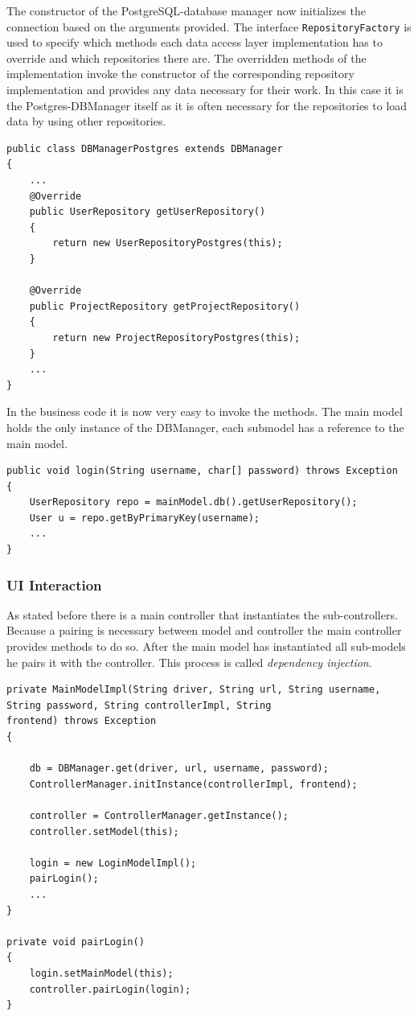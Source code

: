 The constructor of the PostgreSQL-database manager now initializes the connection based on the arguments provided. The interface \texttt{RepositoryFactory} is used to specify which methods each data access layer implementation has to override and which repositories there are. The overridden methods of the implementation invoke the constructor of the corresponding repository implementation and provides any data necessary for their work. In this case it is the Postgres-DBManager itself as it is often necessary for the repositories to load data by using other repositories.

\begin{lstlisting}
public class DBManagerPostgres extends DBManager
{
	...
	@Override
	public UserRepository getUserRepository()
	{
		return new UserRepositoryPostgres(this);
	}
	
	@Override
	public ProjectRepository getProjectRepository()
	{
		return new ProjectRepositoryPostgres(this);
	}
	...
}

\end{lstlisting}

In the business code it is now very easy to invoke the methods. The main model holds the only instance of the DBManager, each submodel has a reference to the main model. 

\begin{lstlisting}
public void login(String username, char[] password) throws Exception
{
	UserRepository repo = mainModel.db().getUserRepository();
	User u = repo.getByPrimaryKey(username);
	...
}
\end{lstlisting}

\subsubsection{UI Interaction}
As stated before there is a main controller that instantiates the sub-controllers. Because a pairing is necessary between model and controller the main controller provides methods to do so. After the main model has instantiated all sub-models he pairs it with the controller. This process is called \emph{dependency injection}.

\begin{lstlisting}
private MainModelImpl(String driver, String url, String username, String password, String controllerImpl, String
frontend) throws Exception
{

	db = DBManager.get(driver, url, username, password);
	ControllerManager.initInstance(controllerImpl, frontend);
	
	controller = ControllerManager.getInstance();
	controller.setModel(this);
	
	login = new LoginModelImpl();
	pairLogin();
	...
}

private void pairLogin()
{
	login.setMainModel(this);
	controller.pairLogin(login);
}

\end{lstlisting}

